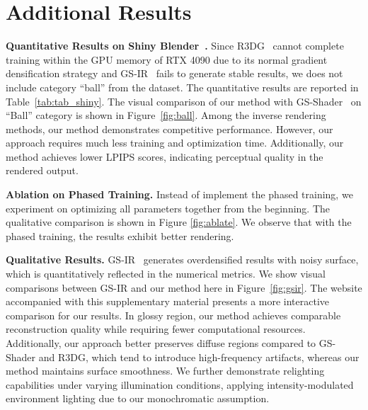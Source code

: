 \begin{figure*}[t]
\vspace{-1ex}
    \centering
    \caption{Visualized comparison with GS-IR~\cite{liang2024gs}}
    \label{fig:gsir}
\end{figure*}

\section{Additional Results}
\noindent\textbf{Quantitative Results on Shiny Blender~\cite{verbin2022ref}.}
Since R3DG~\cite{gao2023relightable} cannot complete training within the GPU memory of RTX 4090 due to its normal gradient densification strategy and GS-IR~\cite{liang2023gs} fails to generate stable results, we does not include category ``ball'' from the dataset. The quantitative results are reported in Table~\ref{tab:tab_shiny}. The visual comparison of our method with GS-Shader~\cite{jiang2024gaussianshader} on ``Ball'' category is shown in Figure~\ref{fig:ball}. Among the inverse rendering methods, our method demonstrates competitive performance. However, our approach requires much less training and optimization time. Additionally, our method achieves lower LPIPS scores, indicating perceptual quality in the rendered output. 


\noindent\textbf{Ablation on Phased Training.}
Instead of implement the phased training, we experiment on optimizing all parameters together from the beginning. The qualitative comparison is shown in Figure \ref{fig:ablate}. We observe that with the phased training, the results exhibit better rendering. 

\noindent\textbf{Qualitative Results.}
GS-IR~\cite{liang2024gs} generates overdensified results with noisy surface, which is quantitatively reflected in the numerical metrics. We show visual comparisons between GS-IR and our method here in Figure~\ref{fig:gsir}. The website accompanied with this supplementary material presents a more interactive comparison for our results. In glossy region, our method achieves comparable reconstruction quality while requiring fewer computational resources. Additionally, our approach better preserves diffuse regions compared to GS-Shader and R3DG, which tend to introduce high-frequency artifacts, whereas our method maintains surface smoothness. We further demonstrate relighting capabilities under varying illumination conditions, applying intensity-modulated environment lighting due to our monochromatic assumption.


